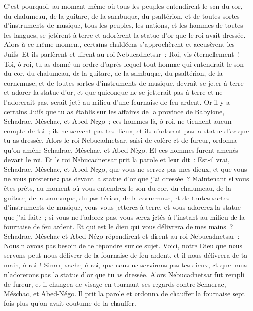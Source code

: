 \begin{multicols}{2}
C'est pourquoi, au moment même où tous les peuples entendirent le son du cor, du chalumeau, de la guitare, de la sambuque, du psaltérion, et de toutes sortes d'instruments de musique, tous les peuples, les nations, et les hommes de toutes les langues, se jetèrent à terre et adorèrent la statue d'or que le roi avait dressée.
Alors à ce même moment, certains chaldéens s'approchèrent et accusèrent les Juifs.
Et ils parlèrent et dirent au roi Nebucadnetsar~: Roi, vis éternellement~!
Toi, ô roi, tu as donné un ordre d'après lequel tout homme qui entendrait le son du cor, du chalumeau, de la guitare, de la sambuque, du psaltérion, de la cornemuse, et de toutes sortes d'instruments de musique, devrait se jeter à terre et adorer la statue d'or,
et que quiconque ne se jetterait pas à terre et ne l'adorerait pas, serait jeté au milieu d'une fournaise de feu ardent.
Or il y a certains Juifs que tu as établis sur les affaires de la province de Babylone, Schadrac, Méschac, et Abed-Négo~; ces hommes-là, ô roi, ne tiennent aucun compte de toi~; ils ne servent pas tes dieux, et ils n'adorent pas la statue d'or que tu as dressée.
Alors le roi Nebucadnetsar, saisi de colère et de fureur, ordonna qu'on amène Schadrac, Méschac, et Abed-Négo. Et ces hommes furent amenés devant le roi.
Et le roi Nebucadnetsar prit la parole et leur dit~: Est-il vrai, Schadrac, Méschac, et Abed-Négo, que vous ne servez pas mes dieux, et que vous ne vous prosternez pas devant la statue d'or que j'ai dressée~?
Maintenant si vous êtes prêts, au moment où vous entendrez le son du cor, du chalumeau, de la guitare, de la sambuque, du psaltérion, de la cornemuse, et de toutes sortes d'instruments de musique, vous vous jetterez à terre, et vous adorerez la statue que j'ai faite~; si vous ne l'adorez pas, vous serez jetés à l'instant au milieu de la fournaise de feu ardent. Et qui est le dieu qui vous délivrera de mes mains~?
Schadrac, Méschac et Abed-Négo répondirent et dirent au roi Nebucadnetsar~: Nous n'avons pas besoin de te répondre sur ce sujet.
Voici, notre Dieu que nous servons peut nous délivrer de la fournaise de feu ardent, et il nous délivrera de ta main, ô roi~!
Sinon, sache, ô roi, que nous ne servirons pas tes dieux, et que nous n'adorerons pas la statue d'or que tu as dressée.
Alors Nebucadnetsar fut rempli de fureur, et il changea de visage en tournant ses regards contre Schadrac, Méschac, et Abed-Négo. Il prit la parole et ordonna de chauffer la fournaise sept fois plus qu'on avait coutume de la chauffer.

\end{multicols}
